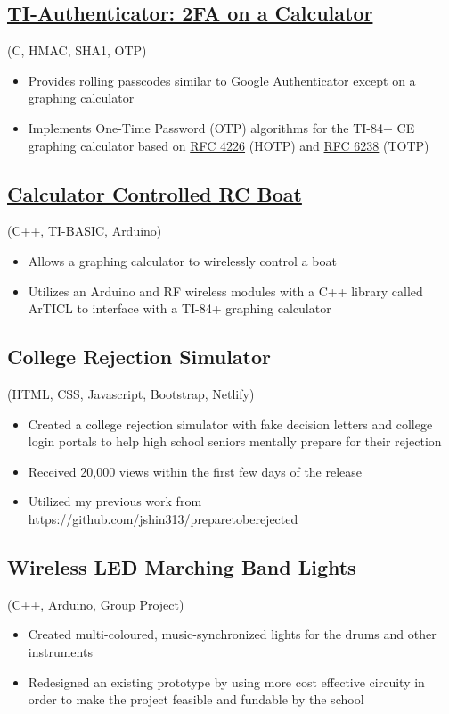 \documentclass{article}
\begin{document}
\subsection{\href{https://github.com/jshin313/ti-authenticator}{TI-Authenticator: 2FA on a Calculator}} (C, HMAC, SHA1, OTP)
\begin{itemize}
    \item Provides rolling passcodes similar to Google Authenticator except on a graphing calculator
    \item Implements One-Time Password (OTP) algorithms for the TI-84+ CE graphing calculator based on \href{https://tools.ietf.org/html/rfc4226}{RFC 4226} (HOTP) and \href{https://tools.ietf.org/html/rfc6238}{RFC 6238} (TOTP)
\end{itemize}

\subsection{\href{https://github.com/jshin313/CalcControlledBoat}{Calculator Controlled RC Boat}} (C++, TI-BASIC, Arduino)
\begin{itemize}
    \item Allows a graphing calculator to wirelessly control a boat
    \item Utilizes an Arduino and RF wireless modules with a C++ library called ArTICL to interface with a TI-84+ graphing calculator
\end{itemize}

\subsection{College Rejection Simulator} (HTML, CSS, Javascript, Bootstrap, Netlify)
\begin{itemize}
    \item Created a college rejection simulator with fake decision letters and college login portals to help high school seniors mentally prepare for their rejection
    \item Received 20,000 views within the first few days of the release
    \item Utilized my previous work from https://github.com/jshin313/preparetoberejected
\end{itemize}

\subsection{Wireless LED Marching Band Lights} (C++, Arduino, Group Project)
\begin{itemize}
    \item Created multi-coloured, music-synchronized lights for the drums and other instruments
    \item Redesigned an existing prototype by using more cost effective circuity in order to make the project feasible and fundable by the school
\end{itemize}
\end{document}
